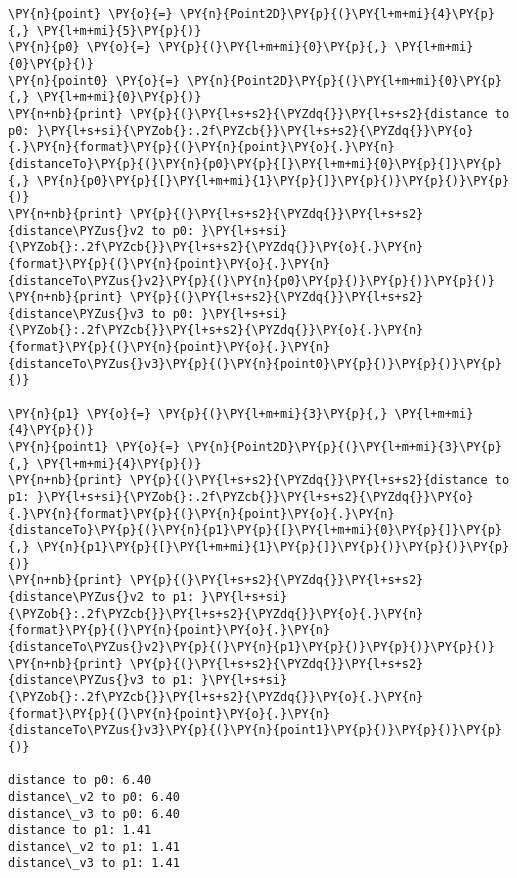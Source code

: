 \begin{Answer}
\begin{tcolorbox}[size=fbox, boxrule=1pt, colback=cellbackground, colframe=cellborder]
\begin{Verbatim}[commandchars=\\\{\}]
\PY{n}{point} \PY{o}{=} \PY{n}{Point2D}\PY{p}{(}\PY{l+m+mi}{4}\PY{p}{,} \PY{l+m+mi}{5}\PY{p}{)}
\PY{n}{p0} \PY{o}{=} \PY{p}{(}\PY{l+m+mi}{0}\PY{p}{,} \PY{l+m+mi}{0}\PY{p}{)}
\PY{n}{point0} \PY{o}{=} \PY{n}{Point2D}\PY{p}{(}\PY{l+m+mi}{0}\PY{p}{,} \PY{l+m+mi}{0}\PY{p}{)}
\PY{n+nb}{print} \PY{p}{(}\PY{l+s+s2}{\PYZdq{}}\PY{l+s+s2}{distance to p0: }\PY{l+s+si}{\PYZob{}:.2f\PYZcb{}}\PY{l+s+s2}{\PYZdq{}}\PY{o}{.}\PY{n}{format}\PY{p}{(}\PY{n}{point}\PY{o}{.}\PY{n}{distanceTo}\PY{p}{(}\PY{n}{p0}\PY{p}{[}\PY{l+m+mi}{0}\PY{p}{]}\PY{p}{,} \PY{n}{p0}\PY{p}{[}\PY{l+m+mi}{1}\PY{p}{]}\PY{p}{)}\PY{p}{)}\PY{p}{)}
\PY{n+nb}{print} \PY{p}{(}\PY{l+s+s2}{\PYZdq{}}\PY{l+s+s2}{distance\PYZus{}v2 to p0: }\PY{l+s+si}{\PYZob{}:.2f\PYZcb{}}\PY{l+s+s2}{\PYZdq{}}\PY{o}{.}\PY{n}{format}\PY{p}{(}\PY{n}{point}\PY{o}{.}\PY{n}{distanceTo\PYZus{}v2}\PY{p}{(}\PY{n}{p0}\PY{p}{)}\PY{p}{)}\PY{p}{)}
\PY{n+nb}{print} \PY{p}{(}\PY{l+s+s2}{\PYZdq{}}\PY{l+s+s2}{distance\PYZus{}v3 to p0: }\PY{l+s+si}{\PYZob{}:.2f\PYZcb{}}\PY{l+s+s2}{\PYZdq{}}\PY{o}{.}\PY{n}{format}\PY{p}{(}\PY{n}{point}\PY{o}{.}\PY{n}{distanceTo\PYZus{}v3}\PY{p}{(}\PY{n}{point0}\PY{p}{)}\PY{p}{)}\PY{p}{)}

\PY{n}{p1} \PY{o}{=} \PY{p}{(}\PY{l+m+mi}{3}\PY{p}{,} \PY{l+m+mi}{4}\PY{p}{)}
\PY{n}{point1} \PY{o}{=} \PY{n}{Point2D}\PY{p}{(}\PY{l+m+mi}{3}\PY{p}{,} \PY{l+m+mi}{4}\PY{p}{)}
\PY{n+nb}{print} \PY{p}{(}\PY{l+s+s2}{\PYZdq{}}\PY{l+s+s2}{distance to p1: }\PY{l+s+si}{\PYZob{}:.2f\PYZcb{}}\PY{l+s+s2}{\PYZdq{}}\PY{o}{.}\PY{n}{format}\PY{p}{(}\PY{n}{point}\PY{o}{.}\PY{n}{distanceTo}\PY{p}{(}\PY{n}{p1}\PY{p}{[}\PY{l+m+mi}{0}\PY{p}{]}\PY{p}{,} \PY{n}{p1}\PY{p}{[}\PY{l+m+mi}{1}\PY{p}{]}\PY{p}{)}\PY{p}{)}\PY{p}{)}
\PY{n+nb}{print} \PY{p}{(}\PY{l+s+s2}{\PYZdq{}}\PY{l+s+s2}{distance\PYZus{}v2 to p1: }\PY{l+s+si}{\PYZob{}:.2f\PYZcb{}}\PY{l+s+s2}{\PYZdq{}}\PY{o}{.}\PY{n}{format}\PY{p}{(}\PY{n}{point}\PY{o}{.}\PY{n}{distanceTo\PYZus{}v2}\PY{p}{(}\PY{n}{p1}\PY{p}{)}\PY{p}{)}\PY{p}{)}
\PY{n+nb}{print} \PY{p}{(}\PY{l+s+s2}{\PYZdq{}}\PY{l+s+s2}{distance\PYZus{}v3 to p1: }\PY{l+s+si}{\PYZob{}:.2f\PYZcb{}}\PY{l+s+s2}{\PYZdq{}}\PY{o}{.}\PY{n}{format}\PY{p}{(}\PY{n}{point}\PY{o}{.}\PY{n}{distanceTo\PYZus{}v3}\PY{p}{(}\PY{n}{point1}\PY{p}{)}\PY{p}{)}\PY{p}{)}

distance to p0: 6.40
distance\_v2 to p0: 6.40
distance\_v3 to p0: 6.40
distance to p1: 1.41
distance\_v2 to p1: 1.41
distance\_v3 to p1: 1.41
\end{Verbatim}
\end{tcolorbox}
\end{Answer}
